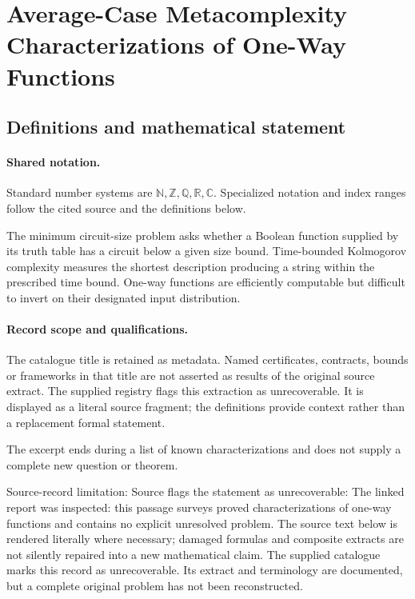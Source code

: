 \documentclass[11pt]{article}
\begin{document}
\section{Average-Case Metacomplexity Characterizations of One-Way Functions}\label{statement}

\subsection{Definitions and mathematical statement}

\paragraph{Shared notation.}Standard number systems are $\mathbb N,\mathbb Z,\mathbb Q,\mathbb R,\mathbb C$. Specialized notation and index ranges follow the cited source and the definitions below.


The minimum circuit-size problem asks whether a Boolean function supplied by its truth table has a circuit below a given size bound. Time-bounded Kolmogorov complexity measures the shortest description producing a string within the prescribed time bound. One-way functions are efficiently computable but difficult to invert on their designated input distribution.
\paragraph{Record scope and qualifications.}
The catalogue title is retained as metadata. Named certificates, contracts, bounds or frameworks in that title are not asserted as results of the original source extract.
The supplied registry flags this extraction as unrecoverable. It is displayed as a literal source fragment; the definitions provide context rather than a replacement formal statement.

The excerpt ends during a list of known characterizations and does not supply a complete new question or theorem.

Source-record limitation: Source flags the statement as unrecoverable: The linked report was inspected: this passage surveys proved characterizations of one-way functions and contains no explicit unresolved problem.
The source text below is rendered literally where necessary; damaged formulas and composite extracts are not silently repaired into a new mathematical claim.
The supplied catalogue marks this record as unrecoverable. Its extract and terminology are documented, but a complete original problem has not been reconstructed.
\end{document}
